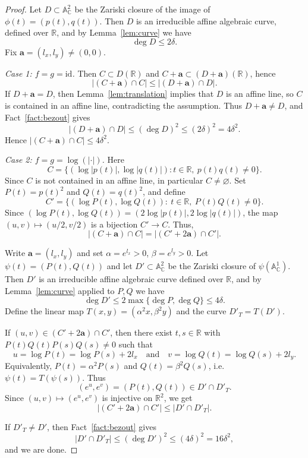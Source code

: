 \documentclass[12pt,reqno]{amsart}
\numberwithin{equation}{section}
\begin{document}
\begin{proof}
Let $D\subset\mathbb A^2_{\mathbb C}$ be the Zariski closure of the image of $\phi(t)=(p(t),q(t))$.
Then $D$ is an irreducible affine algebraic curve, defined over $\mathbb R$, and by Lemma~\ref{lem:curve} we have
\[
\deg D\le 2\delta.
\]
Fix $\mathbf a=(l_x,l_y)\neq(0,0)$.

\smallskip\noindent
\emph{Case 1: $f=g=\mathrm{id}$.}
Then $C\subset D(\mathbb R)$ and $C+\mathbf a\subset (D+\mathbf a)(\mathbb R)$, hence
\[
|(C+\mathbf a)\cap C|\le |(D+\mathbf a)\cap D|.
\]
If $D+\mathbf a=D$, then Lemma~\ref{lem:translation} implies that $D$ is an affine line, so $C$ is contained in an affine line,
contradicting the assumption.
Thus $D+\mathbf a\neq D$, and Fact~\ref{fact:bezout} gives
\[
|(D+\mathbf a)\cap D|\le (\deg D)^2\le (2\delta)^2=4\delta^2.
\]
Hence $|(C+\mathbf a)\cap C|\le 4\delta^2$.

\smallskip\noindent
\emph{Case 2: $f=g=\log(|\cdot|)$.}
Here
\[
C=\{(\log|p(t)|,\log|q(t)|): t\in\mathbb R,\ p(t)q(t)\neq 0\}.
\]
Since $C$ is not contained in an affine line, in particular $C\neq\varnothing$.
Set $P(t)=p(t)^2$ and $Q(t)=q(t)^2$, and define
\[
C'=\{(\log P(t),\log Q(t)):\ t\in\mathbb R,\ P(t)Q(t)\neq 0\}.
\]
Since $(\log P(t),\log Q(t))=(2\log|p(t)|,2\log|q(t)|)$, the map $(u,v)\mapsto (u/2,v/2)$ is a bijection $C'\to C$. Thus,
\[
|(C+\mathbf a)\cap C|=|(C'+2\mathbf a)\cap C'|.
\]

Write $\mathbf a=(l_x,l_y)$ and set $\alpha=e^{l_x}>0$, $\beta=e^{l_y}>0$.
Let $\psi(t)=(P(t),Q(t))$ and let $D'\subset\mathbb A^2_{\mathbb C}$ be the Zariski closure of $\psi(\mathbb A^1_{\mathbb C})$.
Then $D'$ is an irreducible affine algebraic curve defined over $\mathbb R$, and by Lemma~\ref{lem:curve} applied to $P,Q$
we have
\[
\deg D'\le 2\max\{\deg P,\deg Q\}\le 4\delta.
\]
Define the linear map $T(x,y)=(\alpha^2 x,\beta^2 y)$ and the curve $D'_T=T(D')$.

If $(u,v)\in (C'+2\mathbf a)\cap C'$, then there exist $t,s\in\mathbb R$ with $P(t)Q(t)P(s)Q(s)\neq 0$ such that
\[
u=\log P(t)=\log P(s)+2l_x
\quad\text{and}\quad
v=\log Q(t)=\log Q(s)+2l_y.
\]
Equivalently, $P(t)=\alpha^2P(s)$ and $Q(t)=\beta^2Q(s)$, i.e.\ $\psi(t)=T(\psi(s))$.
Thus
\[
(e^u,e^v)=(P(t),Q(t))\in D'\cap D'_T.
\]
Since $(u,v)\mapsto (e^u,e^v)$ is injective on $\mathbb R^2$, we get
\[
|(C'+2\mathbf a)\cap C'|\le |D'\cap D'_T|.
\]

If $D'_T\neq D'$, then Fact~\ref{fact:bezout} gives
\[
|D'\cap D'_T|\le (\deg D')^2\le (4\delta)^2=16\delta^2,
\]
and we are done.


\end{proof}
\end{document}

